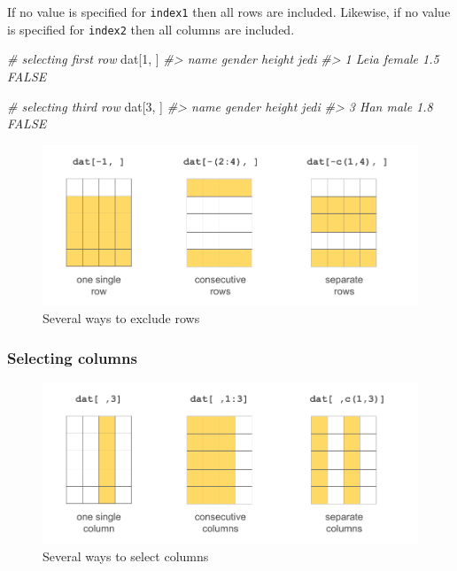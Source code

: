 \documentclass[
]{book}
\newenvironment{Shaded}{\begin{snugshade}}{\end{snugshade}}
\newcommand{\CommentTok}[1]{\textcolor[rgb]{0.56,0.35,0.01}{\textit{#1}}}
\newcommand{\DecValTok}[1]{\textcolor[rgb]{0.00,0.00,0.81}{#1}}
\newcommand{\NormalTok}[1]{#1}
\begin{document}
If no value is specified for \texttt{index1} then all rows are included. Likewise,
if no value is specified for \texttt{index2} then all columns are included.

\begin{Shaded}
\begin{Highlighting}[]
\CommentTok{\# selecting first row}
\NormalTok{dat[}\DecValTok{1}\NormalTok{, ]}
\CommentTok{\#\textgreater{}   name gender height  jedi}
\CommentTok{\#\textgreater{} 1 Leia female    1.5 FALSE}

\CommentTok{\# selecting third row}
\NormalTok{dat[}\DecValTok{3}\NormalTok{, ]}
\CommentTok{\#\textgreater{}   name gender height  jedi}
\CommentTok{\#\textgreater{} 3  Han   male    1.8 FALSE}
\end{Highlighting}
\end{Shaded}

\begin{figure}

{\centering \includegraphics[width=0.8\linewidth]{images/objects/obj-dataframe-rows2} 

}

\caption{Several ways to exclude rows}\label{fig:unnamed-chunk-156}
\end{figure}

\hypertarget{selecting-columns}{%
\subsubsection*{Selecting columns}\label{selecting-columns}}

\begin{figure}

{\centering \includegraphics[width=0.8\linewidth]{images/objects/obj-dataframe-cols1} 

}

\caption{Several ways to select columns}\label{fig:unnamed-chunk-157}
\end{figure}
\end{document}
